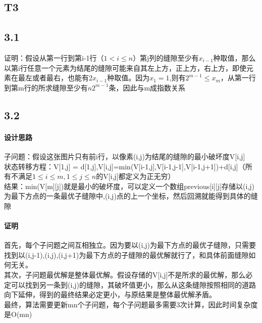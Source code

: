 \documentclass{article}
\begin{document}
\begin{CJK}{UTF8}{gkai}
\section{T3}
\subsection{3.1}
证明：假设从第一行到第i-1行（$1<i \leq n$）第j列的缝隙至少有$x_{i-1}$种取值，那么以第i行任意一个元素为结尾的缝隙可能来自其左上方，正上方，右上方，即使元素在最左或者最右，也能有2$x_{i-1}$种取值。因为$x_{1} = 1$,则有$2^{m-1}\leq x_{m}$，从第一行到第m行的所求缝隙至少有$n2^{m-1}$条，因此与m成指数关系
\subsection{3.2}
\paragraph{设计思路}
子问题：假设这张图片只有前i行，以像素(i,j)为结尾的缝隙的最小破坏度V[i,j]\\
状态转移方程：V[1,j] = d[1,j],V[i,j]=min(V[i-1,j],V[i-1,j-1],V[i-1,j+1])+d[i,j]（所有不满足$1 \leq i \leq m,1\leq j\leq n$的V[i,j]都定义为正无穷）\\
结果：min(V[m][j])就是最小的破坏度，可以定义一个数组previous[i][j]存储以(i,j)为最下方点的一条最优子缝隙中,(i,j)点的上一个坐标，然后回溯就能得到具体的缝隙
\paragraph{证明}
首先，每个子问题之间互相独立。因为要以(i,j)为最下方点的最优子缝隙，只需要找到以(i,j-1),(i,j),(i,j+1)为最下方点的子缝隙的最优解就行了，和具体前面缝隙如何无关。\\
其次，子问题最优解是整体最优解。假设存储的V[i,j]不是所求的最优解，那么必定可以找到另一条到(i,j)的缝隙，其破坏值更小，那么从这条缝隙按照相同的道路向下延伸，得到的最终结果必定更小，与原结果是整体最优解矛盾。\\
最终，算法需要更新mn个子问题，每个子问题最多需要3次计算，因此时间复杂度是O(mn)\\

\end{CJK}
\end{document}
